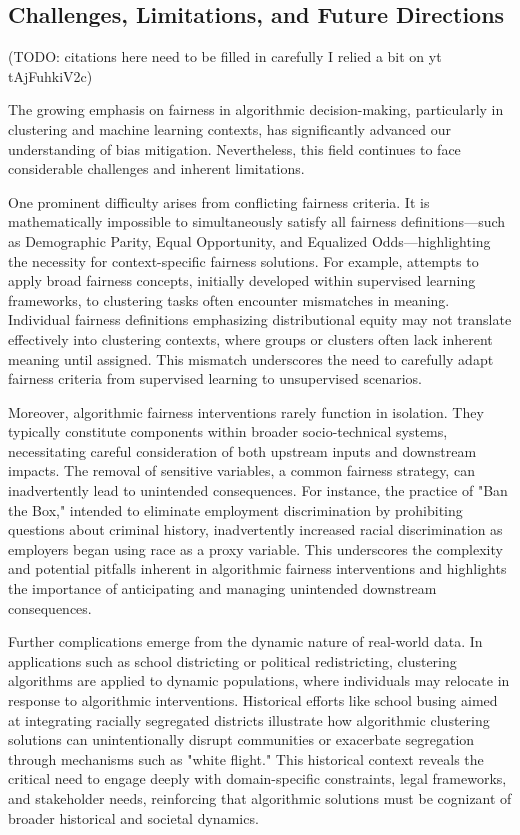 \subsection{Challenges, Limitations, and Future
Directions}\label{subsec:challenges_future}
(TODO: citations here need to be filled in carefully I relied a bit
on yt tAjFuhkiV2c)

The growing emphasis on fairness in algorithmic decision-making,
particularly in clustering and machine learning contexts, has
significantly advanced our understanding of bias mitigation.
Nevertheless, this field continues to face considerable challenges
and inherent limitations.

One prominent difficulty arises from conflicting fairness criteria.
It is mathematically impossible to simultaneously satisfy all
fairness definitions—such as Demographic Parity, Equal Opportunity,
and Equalized Odds—highlighting the necessity for context-specific
fairness solutions. For example, attempts to apply broad fairness
concepts, initially developed within supervised learning frameworks,
to clustering tasks often encounter mismatches in meaning. Individual
fairness definitions emphasizing distributional equity may not
translate effectively into clustering contexts, where groups or
clusters often lack inherent meaning until assigned. This mismatch
underscores the need to carefully adapt fairness criteria from
supervised learning to unsupervised scenarios.

Moreover, algorithmic fairness interventions rarely function in
isolation. They typically constitute components within broader
socio-technical systems, necessitating careful consideration of both
upstream inputs and downstream impacts. The removal of sensitive
variables, a common fairness strategy, can inadvertently lead to
unintended consequences. For instance, the practice of "Ban the Box,"
intended to eliminate employment discrimination by prohibiting
questions about criminal history, inadvertently increased racial
discrimination as employers began using race as a proxy variable.
This underscores the complexity and potential pitfalls inherent in
algorithmic fairness interventions and highlights the importance of
anticipating and managing unintended downstream consequences.

Further complications emerge from the dynamic nature of real-world
data. In applications such as school districting or political
redistricting, clustering algorithms are applied to dynamic
populations, where individuals may relocate in response to
algorithmic interventions. Historical efforts like school busing
aimed at integrating racially segregated districts illustrate how
algorithmic clustering solutions can unintentionally disrupt
communities or exacerbate segregation through mechanisms such as
"white flight." This historical context reveals the critical need to
engage deeply with domain-specific constraints, legal frameworks, and
stakeholder needs, reinforcing that algorithmic solutions must be
cognizant of broader historical and societal dynamics.

